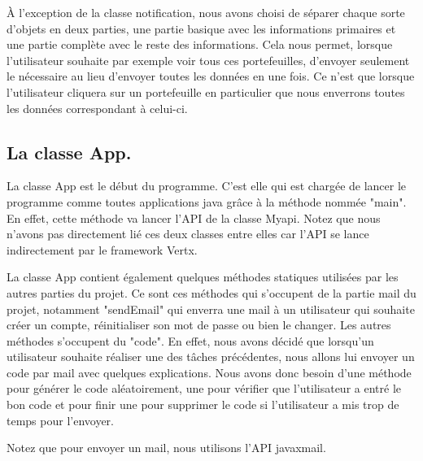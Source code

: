 \begin{flushleft}
À l'exception de la classe notification, nous avons choisi de séparer chaque sorte d'objets en deux parties, une partie basique avec les informations primaires et une partie complète avec le reste des informations. Cela nous permet, lorsque l'utilisateur souhaite par exemple voir tous ces portefeuilles, d'envoyer seulement le nécessaire au lieu d'envoyer toutes les données en une fois. Ce n'est que lorsque l'utilisateur cliquera sur un portefeuille en particulier que nous enverrons toutes les données correspondant à celui-ci.
\end{flushleft}
\newpage
\subsection{La classe App.}

\begin{flushleft}
La classe App est le début du programme. C'est elle qui est chargée de lancer le programme comme toutes applications java grâce à la méthode nommée "main". En effet, cette méthode va lancer l'API de la classe Myapi. Notez que nous n'avons pas directement lié ces deux classes entre elles car l'API se lance indirectement par le framework Vertx.
\end{flushleft}

\begin{flushleft}
La classe App contient également quelques méthodes statiques utilisées par les autres parties du projet. Ce sont ces méthodes qui s'occupent de la partie mail du projet, notamment "sendEmail" qui enverra une mail à un utilisateur qui souhaite créer un compte, réinitialiser son mot de passe ou bien le changer. Les autres méthodes s'occupent du "code". En effet, nous avons décidé que lorsqu'un utilisateur souhaite réaliser une des tâches précédentes, nous allons lui envoyer un code par mail avec quelques explications. Nous avons donc besoin d'une méthode pour générer le code aléatoirement, une pour vérifier que l'utilisateur a entré le bon code et pour finir une pour supprimer le code si l'utilisateur a mis trop de temps pour l'envoyer.
\end{flushleft}

\begin{flushleft}
Notez que pour envoyer un mail, nous utilisons l'API javaxmail.
\end{flushleft}


